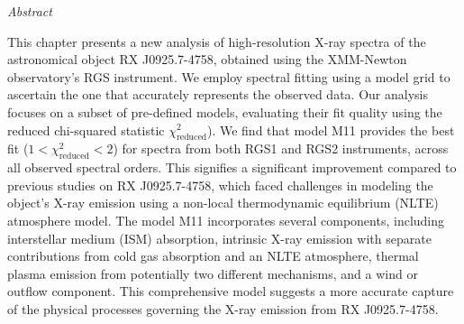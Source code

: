 \newpage
\begin{center}
	\emph{Abstract}
\end{center}
    
    This chapter presents a new analysis of high-resolution X-ray spectra of the astronomical object RX J0925.7-4758, obtained using the XMM-Newton observatory's RGS instrument. We employ spectral fitting using a model grid to ascertain the one that accurately represents the observed data. Our analysis focuses on a subset of pre-defined models, evaluating their fit quality using the reduced chi-squared statistic $\chi^2_\text{reduced}$). We find that model M11 provides the best fit ($1<\chi^2_\text{reduced}<2$) for spectra from both RGS1 and RGS2 instruments, across all observed spectral orders. This signifies a significant improvement compared to previous studies on RX J0925.7-4758, which faced challenges in modeling the object's X-ray emission using a non-local thermodynamic equilibrium (NLTE) atmosphere model. The model M11 incorporates several components, including interstellar medium (ISM) absorption, intrinsic X-ray emission with separate contributions from cold gas absorption and an NLTE atmosphere, thermal plasma emission from potentially two different mechanisms, and a wind or outflow component. This comprehensive model suggests a more accurate capture of the physical processes governing the X-ray emission from RX J0925.7-4758.